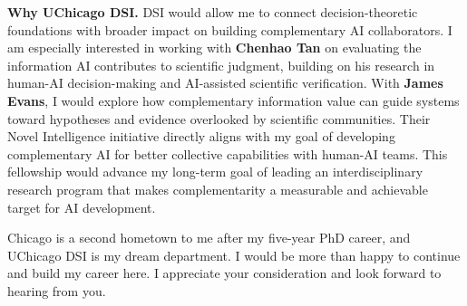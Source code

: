 \textbf{Why UChicago DSI.}
DSI would allow me to connect decision-theoretic foundations with broader impact on building complementary AI collaborators.
I am especially interested in working with \textbf{Chenhao Tan} on evaluating the information AI contributes to scientific judgment, building on his research in human-AI decision-making and AI-assisted scientific verification.
With \textbf{James Evans}, I would explore how complementary information value can guide systems toward hypotheses and evidence overlooked by scientific communities.
Their Novel Intelligence initiative directly aligns with my goal of developing complementary AI for better collective capabilities with human-AI teams.
This fellowship would advance my long-term goal of leading an interdisciplinary research program that makes complementarity a measurable and achievable target for AI development.

Chicago is a second hometown to me after my five-year PhD career, and UChicago DSI is my dream department.
I would be more than happy to continue and build my career here.
I appreciate your consideration and look forward to hearing from you.

